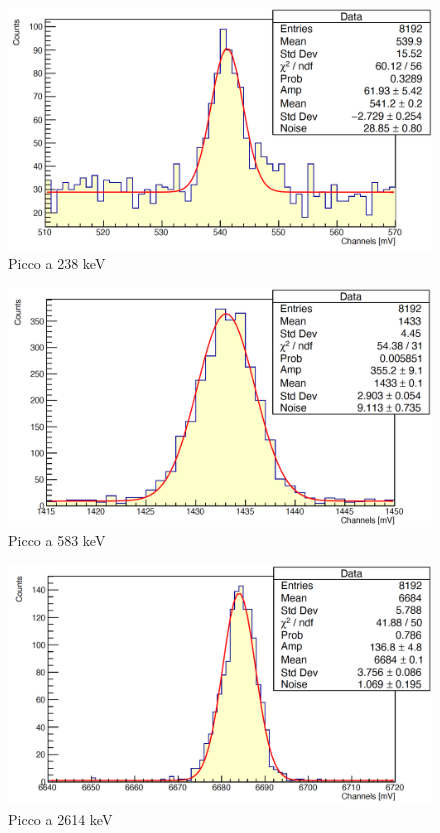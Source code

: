 \documentclass[a4paper,10pt]{article}
\begin{document}
\begin{figure}[H]
    \centering
    \includegraphics[scale=0.45]{appendice/spettri/ThPb1_58}
    \caption{Picco a 238 keV}
\end{figure}
\begin{figure}[H]
    \centering
    \includegraphics[scale=0.45]{appendice/spettri/ThPb2_58}
    \caption{Picco a 583 keV}
\end{figure}
\begin{figure}[H]
    \centering
    \includegraphics[scale=0.45]{appendice/spettri/ThPb3_58}
    \caption{Picco a 2614 keV}
\end{figure}
\end{document}
